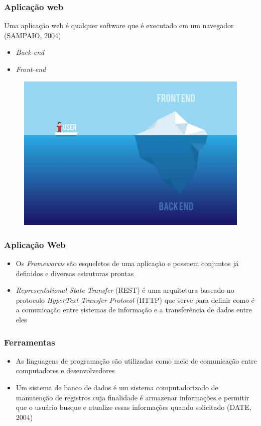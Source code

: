 \documentclass{beamer}
\begin{document}
	\begin{frame}\frametitle{Aplicação web}
		Uma aplicação web é qualquer software que é executado em um navegador (SAMPAIO, 2004)
		\begin{itemize}
			\item \textit{Back-end}
			\item \textit{Front-end}
		\end{itemize}
		\begin{figure}[ht]
			\centering
			\includegraphics[scale=0.11]{img/front-back.jpg}
		\end{figure}
	\end{frame}

	\begin{frame}\frametitle{Aplicação Web}
		\begin{itemize}
			\item Os \textit{Frameworws} são esqueletos de uma aplicação e possuem conjuntos já definidos e diversas estruturas prontas
			\item \textit{Representational State Transfer} (REST) é uma arquitetura baseado no protocolo \textit{HyperText Transfer Protocol} (HTTP) que serve para definir como é a comunicação entre sistemas de informação e a transferência de dados entre eles
		\end{itemize}
	\end{frame}


	\begin{frame}\frametitle{Ferramentas}
		\begin{itemize}
			\item As linguagens de programação são utilizadas como meio de comunicação entre computadores e desenvolvedores
			\item Um sistema de banco de dados é um sistema computadorizado de manutenção de registros cuja finalidade é armazenar informações e permitir que o usuário busque e atualize essas informações quando solicitado (DATE, 2004)
		\end{itemize}
	\end{frame}
\end{document}

